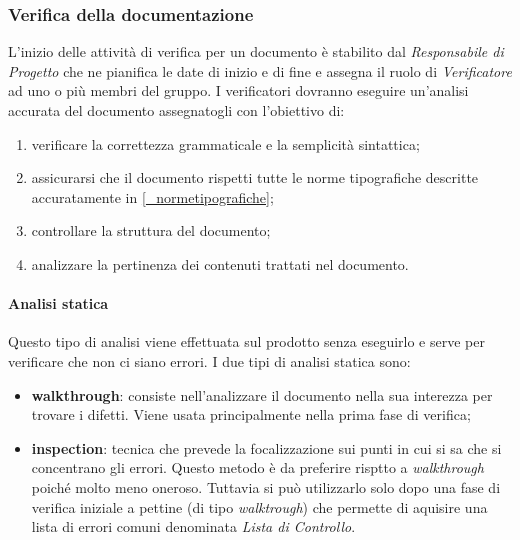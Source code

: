 \subsubsection{Verifica della documentazione}
L'inizio delle attività di verifica per un documento è stabilito dal \textit{Responsabile di Progetto} che ne pianifica le date di inizio e di fine e assegna il ruolo di \textit{Verificatore} ad uno o più membri del gruppo. I verificatori dovranno eseguire un'analisi accurata del documento assegnatogli con l'obiettivo di:
\begin{enumerate}
    \item verificare la correttezza grammaticale e la semplicità sintattica;
    \item assicurarsi che il documento rispetti tutte le norme tipografiche descritte accuratamente in \ref{_normetipografiche};
    \item controllare la struttura del documento;
    \item analizzare la pertinenza dei contenuti trattati nel documento.
\end{enumerate}

\paragraph{Analisi statica}
Questo tipo di analisi viene effettuata sul prodotto senza eseguirlo e serve per verificare che non ci siano errori. I due tipi di analisi statica sono:
\begin{itemize}
    \item \textbf{walkthrough}: consiste nell'analizzare il documento nella sua interezza per trovare i difetti. Viene usata principalmente nella prima fase di verifica;
    \item \textbf{inspection}: tecnica che prevede la focalizzazione sui punti in cui si sa che si concentrano gli errori. Questo metodo è da preferire risptto a \textit{walkthrough} poiché molto meno oneroso. Tuttavia si può utilizzarlo solo dopo una fase di verifica iniziale a pettine (di tipo \textit{walktrough}) che permette di aquisire una lista di errori comuni denominata \textit{Lista di Controllo}. 
\end{itemize}

